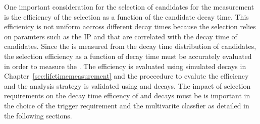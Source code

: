 One important consideration for the selection of candidates for the \bsmumu \el measurement is the efficiency of the selection as a function of the candidate decay time. This efficienicy is not uniform accross different decay times because the selection relies on paramters such as the IP \chiIP and \chiFD that are correlated with the decay time of \bsmumu candidates.
Since the \el is measured from the decay time distribution of \bsmumu candidates, the selection efficiency as a function of decay time must be accurately evaluated in order to measure the \el. The efficiency is evaluated using simulated \bsmumu decays in Chapter~\ref{sec:lifetimemeasurement}
and the proceedure to evalute the efficiency and the analysis strategy is validated using \bdkpi and \bskk decays. The impact of selection requirements on the decay time efficency of \bsmumu and \bhh decays must be is important in the choice of the trigger requirement and the multivarite classfier as detailed in the following sections.







